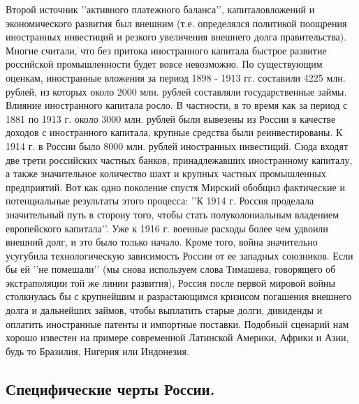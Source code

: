 \documentclass[12pt]{article}
\begin{document}
Второй источник \rq\rq{}активного платежного баланса\rq\rq{}, капиталовложений и экономического развития был внешним (т.е. определялся политикой поощрения иностранных инвестиций и резкого увеличения внешнего долга правительства). Многие считали, что без притока иностранного капитала быстрое развитие российской промышленности будет вовсе невозможно. По существующим оценкам, иностранные вложения за период 1898 - 1913 гг. составили 4225 млн. рублей, из которых около 2000 млн. рублей составляли государственные займы. Влияние иностранного капитала росло. В частности, в то время как за период с 1881 по 1913 г. около 3000 млн. рублей были вывезены из России в качестве доходов с иностранного капитала, крупные средства были реинвестированы. К 1914 г. в России было 8000 млн. рублей иностранных инвестиций. Сюда входят две трети российских частных банков, принадлежавших иностранному капиталу, а также значительное количество шахт и крупных частных промышленных предприятий. Вот как одно поколение спустя Мирский обобщил фактические и потенциальные результаты этого процесса: \rq\rq{}К 1914 г. Россия проделала значительный путь в сторону того, чтобы стать полуколониальным владением европейского капитала\rq\rq{}. Уже к 1916 г. военные расходы более чем удвоили внешний долг, и это было только начало. Кроме того, война значительно усугубила технологическую зависимость России от ее западных союзников. Если бы ей \rq\rq{}не помешали\rq\rq{} (мы снова используем слова Тимашева, говорящего об экстраполяции той же линии развития), Россия после первой мировой войны столкнулась бы с крупнейшим и разрастающимся кризисом погашения внешнего долга и дальнейших займов, чтобы выплатить старые долги, дивиденды и оплатить иностранные патенты и импортные поставки. Подобный сценарий нам хорошо известен на примере современной Латинской Америки, Африки и Азии, будь то Бразилия, Нигерия или Индонезия.

\newpage
\subsection{ Специфические черты России.}
\end{document}
